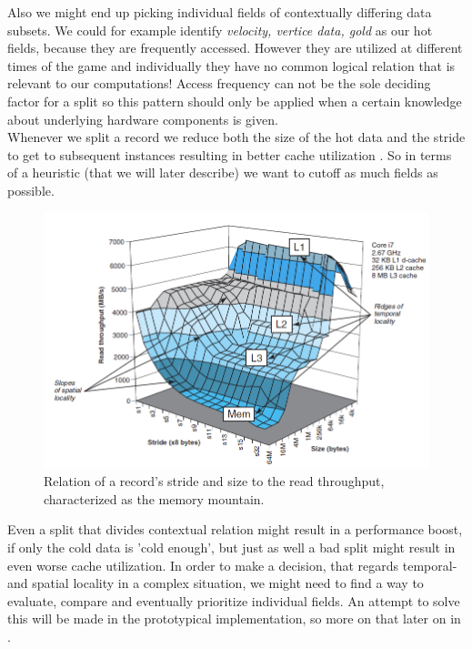 Also we might end up picking individual fields of contextually differing data subsets. We could for example identify \textit{velocity, vertice data, gold} as our hot fields, because they are frequently accessed. However they are utilized at different times of the game and individually they have no common logical relation that is relevant to our computations! Access frequency can not be the sole deciding factor for a split so this pattern should only be applied when a certain knowledge about underlying hardware components is given.\\
Whenever we split a record we reduce both the size of the hot data and the stride to get to subsequent instances resulting in better cache utilization . So in terms of a heuristic (that we will later describe) we want to cutoff as much fields as possible.
\begin{figure}[!htbp]
	\centering
	\includegraphics[width=\textwidth, height=0.5\textwidth]{PICs/memory_mountain}
	\caption{Relation of a record's stride and size to the read throughput, characterized as the memory mountain. }\label{memory_mountain}
\end{figure}
Even a split that divides contextual relation might result in a performance boost, if only the cold data is 'cold enough', but just as well a bad split might result in even worse cache utilization.
In order to make a decision, that regards temporal- and spatial locality in a complex situation, we might need to find a way to evaluate, compare and eventually prioritize individual fields. An attempt to solve this will be made in the prototypical implementation, so more on that later on in .

